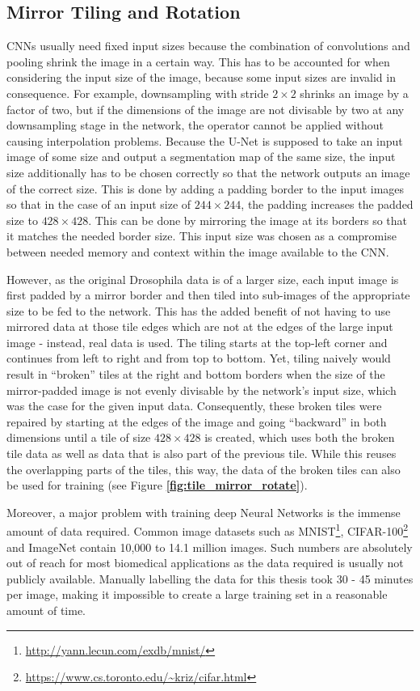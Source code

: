 		\subsection{Mirror Tiling and Rotation}
\label{subsec:mirror_tiling}
CNNs usually need fixed input sizes because the combination of convolutions and pooling shrink the image in a certain way. This has to be accounted for when considering the input size of the image, because some input sizes are invalid in consequence. For example, downsampling with stride $2 \times 2$ shrinks an image by a factor of two, but if the dimensions of the image are not divisable by two at any downsampling stage in the network, the operator cannot be applied without causing interpolation problems. Because the U-Net is supposed to take an input image of some size and output a segmentation map of the same size, the input size additionally has to be chosen correctly so that the network outputs an image of the correct size. This is done by adding a padding border to the input images so that in the case of an input size of $244 \times 244$, the padding increases the padded size to $428 \times 428$. This can be done by mirroring the image at its borders so that it matches the needed border size. This input size was chosen as a compromise between needed memory and context within the image available to the CNN.

However, as the original Drosophila data is of a larger size, each input image is first padded by a mirror border and then tiled into sub-images of the appropriate size to be fed to the network. This has the added benefit of not having to use mirrored data at those tile edges which are not at the edges of the large input image - instead, real data is used. The tiling starts at the top-left corner and continues from left to right and from top to bottom. Yet, tiling naively would result in ``broken'' tiles at the right and bottom borders when the size of the mirror-padded  image is not evenly divisable by the network's input size, which was the case for the given input data. Consequently, these broken tiles were repaired by starting at the edges of the image and going ``backward'' in both dimensions until a tile of size $428 \times 428$ is created, which uses both the broken tile data as well as data that is also part of the previous tile. While this reuses the overlapping parts of the tiles, this way, the data of the broken tiles can also be used for training (see Figure \textbf{\ref{fig:tile_mirror_rotate}}).

\noindent Moreover, a major problem with training deep Neural Networks is the immense amount of data required. Common image datasets such as MNIST\footnote{\url{http://yann.lecun.com/exdb/mnist/}}, CIFAR-100\footnote{\url{https://www.cs.toronto.edu/~kriz/cifar.html}} and ImageNet \cite{ILSVRC} contain 10,000 to 14.1 million images. Such numbers are absolutely out of reach for most biomedical applications as the data required is usually not publicly available. Manually labelling the data for this thesis took 30 - 45 minutes per image, making it impossible to create a large training set in a reasonable amount of time.

